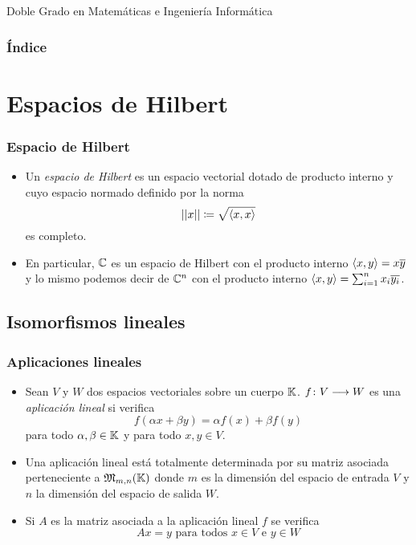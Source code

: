 \documentclass{beamer}
\begin{document}
\begin{frame}
	\titlepage
	\begin{center} Doble Grado en Matemáticas e Ingeniería Informática\end{center}
\end{frame}

\begin{frame}
\frametitle{Índice}
	\tableofcontents
\end{frame}

\section{Espacios de Hilbert}
\begin{frame}
	\frametitle{Espacio de Hilbert}
	\begin{itemize}
		\item  Un \emph{espacio de Hilbert} es un espacio vectorial dotado de producto interno y cuyo espacio normado definido por la norma
		$$\left|\left|x\right|\right|\coloneqq\sqrt{\langle x,x\rangle}$$
es completo.
		\item En particular, $\mathbb{C}$ es un espacio de Hilbert con el producto interno $\langle x,y\rangle=x\overline{y}$ y lo mismo podemos decir de $\mathbb{C}^n$ con el producto interno $\langle x,y\rangle=\sum_{i=1}^n x_i\overline{y_i}$.
	\end{itemize}
\end{frame}

\subsection*{Isomorfismos lineales}
\begin{frame}
	\frametitle{Aplicaciones lineales}
	\begin{itemize}
		\item  Sean $V$ y $W$ dos espacios vectoriales sobre un cuerpo $\mathbb{K}$. $f\colon V\longrightarrow W$ es una \emph{aplicación lineal} si verifica
		$$f(\alpha x+ \beta y)= \alpha f(x)+\beta f(y)$$
		para todo $\alpha,\beta\in\mathbb{K}$ y para todo $x,y\in V$.
		\item Una aplicación lineal está totalmente determinada por su matriz asociada perteneciente a $\mathfrak{M}_{m,n}(\mathbb{K})$ donde $m$ es la dimensión del espacio de entrada $V$ y $n$ la dimensión del espacio de salida $W$.
		\item Si $A$ es la matriz asociada a la aplicación lineal $f$ se verifica
		$$Ax=y \textrm{ para todos }x\in V \textrm{ e } y\in W$$
	\end{itemize}
\end{frame}
\end{document}
